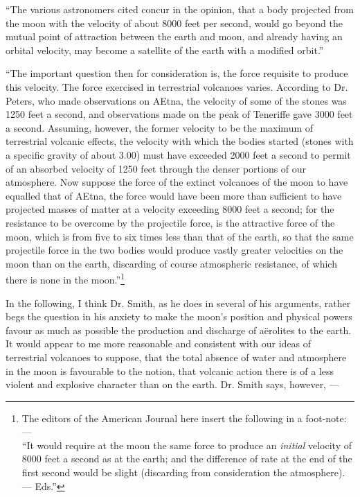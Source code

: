 \documentclass[a4paper, 12pt, oneside]{article}
\begin{document}
``The various astronomers cited concur in the opinion, that a body projected from the moon with the velocity of about 8000 feet per second, would go beyond the mutual point of attraction between the earth and moon, and already having an orbital velocity, may become a satellite of the earth with a modified orbit.''

``The important question then for consideration is, the force requisite to produce this velocity. The force exercised in terrestrial volcanoes varies. According to Dr. Peters, who made observations on AEtna, the velocity of some of the stones was 1250 feet a second, and observations made on the peak of Teneriffe gave 3000 feet a second. Assuming, however, the former velocity to be the maximum of terrestrial volcanic effects, the velocity with which the bodies started (stones with a specific gravity of about 3.00) must have exceeded 2000 feet a second to permit of an absorbed velocity of 1250 feet through the denser portions of our atmosphere. Now suppose the force of the extinct volcanoes of the moon to have equalled that of AEtna, the force would have been more than sufficient to have projected masses of matter at a velocity exceeding 8000 feet a second; for the resistance to be overcome by the projectile force, is the attractive force of the moon, which is from five to six times less than that of the earth, so that the same projectile force in the two bodies would produce vastly greater velocities on the moon than on the earth, discarding of course atmospheric resistance, of which there is none in the moon.''\footnote{The editors of the American Journal here insert the following in a foot-note:--- \\ \hspace*{6mm}``It would require at the moon the same force to produce an \emph{initial} velocity of 8000 feet a second as at the earth; and the difference of rate at the end of the first second would be slight (discarding from consideration the atmosphere). --- Eds.''}

In the following, I think Dr. Smith, as he does in several of his arguments, rather begs the question in his anxiety to make the moon's position and physical powers favour as much as possible the production and discharge of aërolites to the earth. It would appear to me more reasonable and consistent with our ideas of terrestrial volcanoes to suppose, that the total absence of water and atmosphere in the moon is favourable to the notion, that volcanic action there is of a less violent and explosive character than on the earth. Dr. Smith says, however, ---
\end{document}
